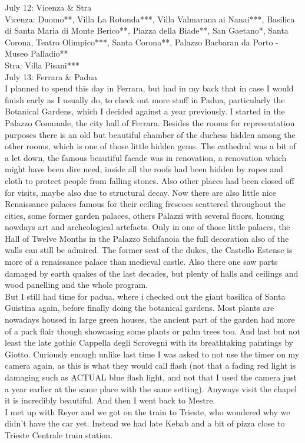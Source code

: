 July 12: Vicenza \& Stra\\
Vicenza: Duomo**, Villa La Rotonda***, Villa Valmarana ai Nanai***, Basilica di Santa Maria di Monte Berico**, Piazza della Biade**, San Gaetano*, Santa Corona, Teatro Olimpico***, Santa Corona**, Palazzo Barbaran da Porto - Museo Palladio**\\
Stra: Villa Pisani***\\

July 13: Ferrara \& Padua\\
I planned to spend this day in Ferrara, but had in my back that in case I would finish early as I usually do, to check out more stuff in Padua, particularly the Botanical Gardens, which I decided against a year previously. I started in the Palazzo Comunale, the city hall of Ferrara. Besides the rooms for representation purposes there is an old but beautiful chamber of the duchess hidden among the other rooms, which is one of those little hidden gems. The cathedral was a bit of a let down, the famous beautiful facade was in renovation, a renovation which might have been dire need, inside all the roofs had been hidden by ropes and cloth to protect people from falling stones. Also other places had been closed off for visits, maybe also due to structural decay. Now there are also little nice Renaissance palaces famous for their ceiling frescoes scattered throughout the cities, some former garden palaces, others Palazzi with several floors, housing nowdays art and archeological artefacts. Only in one of those little palaces, the Hall of Twelve Months in the Palazzo Schifanoia the full decoration also of the walls can still be admired. The former seat of the dukes, the Castello Estense is more of a renaissance palace than medieval castle. Also there one saw parts damaged by earth quakes of the last decades, but plenty of halls and ceilings and wood panelling and the whole program.\\
But I still had time for padua, where i checked out the giant basilica of Santa Guistina again, before finally doing the botanical gardens. Most plants are nowadays housed in large green houses, the ancient part of the garden had more of a park flair though showcasing some plants or palm trees too. And last but not least the late gothic Cappella degli Scrovegni with its breathtaking paintings by Giotto. Curiously enough unlike last time I was asked to not use the timer on my camera again, as this is what they would call flash (not that a fading red light is damaging such as ACTUAL blue flash light, and not that I used the camera just a year earlier at the same place with the same setting). Anyways visit the chapel it is incredibly beautiful. And then I went back to Mestre.\\
I met up with Reyer and we got on the train to Trieste, who wondered why we didn't have the car yet. Instead we had late Kebab and a bit of pizza close to Trieste Centrale train station.\\

